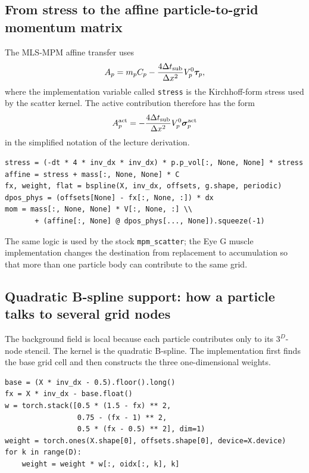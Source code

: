 \documentclass[11pt]{article}
\begin{document}
\subsection{From stress to the affine particle-to-grid momentum matrix}

The MLS-MPM affine transfer uses
\begin{equation}
A_p=m_pC_p-\frac{4\Delta t_{\rm sub}}{\Delta x^2}V_p^0\boldsymbol{\tau}_p,
\label{eq:auto31}
\end{equation}
where the implementation variable called \texttt{stress} is the Kirchhoff-form stress used by the scatter kernel. The active contribution therefore has the form
\begin{equation}
A_p^{\rm act}
=
-\frac{4\Delta t_{\rm sub}}{\Delta x^2}V_p^0\boldsymbol{\sigma}^{\rm act}_p
\label{eq:auto32}
\end{equation}
in the simplified notation of the lecture derivation.

\begin{lstlisting}[caption={\texttt{prototype/eye/muscle\_ops.py}: stress-to-affine conversion and particle momentum.},label={lst:affine-code}]
stress = (-dt * 4 * inv_dx * inv_dx) * p.p_vol[:, None, None] * stress
affine = stress + mass[:, None, None] * C
fx, weight, flat = bspline(X, inv_dx, offsets, g.shape, periodic)
dpos_phys = (offsets[None] - fx[:, None, :]) * dx
mom = mass[:, None, None] * V[:, None, :] \\
       + (affine[:, None] @ dpos_phys[..., None]).squeeze(-1)
\end{lstlisting}

The same logic is used by the stock \texttt{mpm\_scatter}; the Eye G muscle implementation changes the destination from replacement to accumulation so that more than one particle body can contribute to the same grid.

\subsection{Quadratic B-spline support: how a particle talks to several grid nodes}

The background field is local because each particle contributes only to its $3^D$-node stencil. The kernel is the quadratic B-spline. The implementation first finds the base grid cell and then constructs the three one-dimensional weights.

\begin{lstlisting}[caption={\texttt{src/plexus/operators/mpm\_grid.py}: quadratic B-spline weights and $3^D$ stencil.},label={lst:bspline-code}]
base = (X * inv_dx - 0.5).floor().long()
fx = X * inv_dx - base.float()
w = torch.stack([0.5 * (1.5 - fx) ** 2,
                 0.75 - (fx - 1) ** 2,
                 0.5 * (fx - 0.5) ** 2], dim=1)
weight = torch.ones(X.shape[0], offsets.shape[0], device=X.device)
for k in range(D):
    weight = weight * w[:, oidx[:, k], k]
\end{lstlisting}
\end{document}
